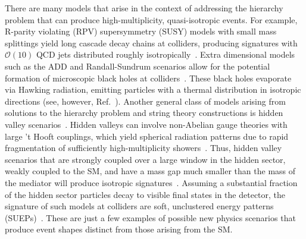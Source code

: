 \documentclass[letterpaper,11pt]{article}
\DeclareRobustCommand{\Ref}[1]{Ref.~\cite{#1}}
\begin{document}
There are many models that arise in the context of addressing the hierarchy problem that can produce high-multiplicity, quasi-isotropic events. 
%
For example, R-parity violating (RPV) supersymmetry (SUSY) models with small mass splittings yield long cascade decay chains at colliders, producing signatures with $\mathcal{O}(10)$ QCD jets distributed roughly isotropically~\cite{Barbier:2004ez, Evans:2013jna}.
%
Extra dimensional models \cite{Appelquist:1987nr} such as the ADD \cite{ArkaniHamed:1998rs} and Randall-Sundrum \cite{Randall:1999ee} scenarios allow for the potential formation of microscopic black holes at colliders~\cite{Giddings:2001bu,Dimopoulos:2001hw}. 
%
These black holes evaporate via Hawking radiation, emitting particles with a thermal distribution in isotropic directions \cite{Harris:2003db,Dai:2007ki,Cavagli2007CatfishAM} (see, however, \Ref{Meade:2007sz}).
%
Another general class of models arising from solutions to the hierarchy problem and string theory constructions is hidden valley scenarios~\cite{Strassler:2006im}.  
%
Hidden valleys can involve non-Abelian gauge theories with large 't Hooft couplings, which yield spherical radiation patterns due to rapid fragmentation of sufficiently high-multiplicity showers~\cite{Polchinski:2002jw,Hofman:2008ar,Hatta:2008tx}. 
%
Thus, hidden valley scenarios that are strongly coupled over a large window in the hidden sector, weakly coupled to the SM, and have a mass gap much smaller than the mass of the mediator will produce isotropic signatures~\cite{Strassler:2008bv, Strassler:2008fv}.
%
Assuming a substantial fraction of the hidden sector particles decay to visible final states in the detector, the signature of such models at colliders are soft, unclustered energy patterns (SUEPs)~\cite{Knapen:2016hky}. 
%
These are just a few examples of possible new physics scenarios that produce event shapes distinct from those arising from the SM.
\end{document}
